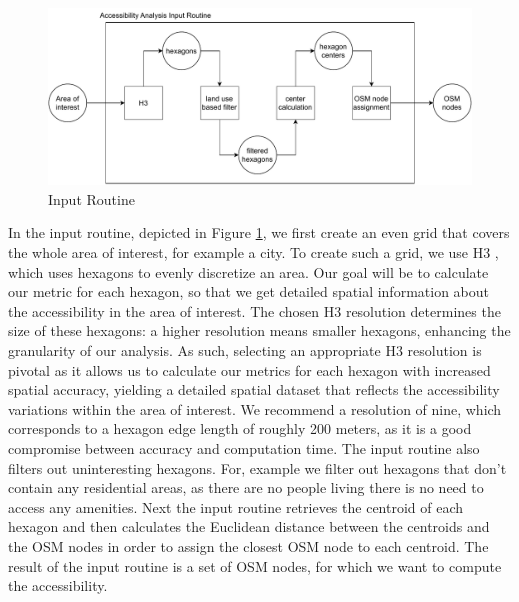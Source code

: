 \begin{figure}
    \centering
    \includegraphics[scale=0.60]{Figures/method/input_routine}
    \caption{Input Routine}
    \label{fig:input_routine}
\end{figure}
In the input routine, depicted in Figure \ref{fig:input_routine}, we first create an even grid that covers the whole area of interest, for example a city.
To create such a grid, we use H3 , which uses hexagons to evenly discretize an area.
Our goal will be to calculate our metric for each hexagon, so that we get detailed spatial information about the accessibility in the area of interest.
The chosen H3 resolution determines the size of these hexagons: a higher resolution means smaller hexagons, enhancing the granularity of our analysis. 
As such, selecting an appropriate H3 resolution is pivotal as it allows us to calculate our metrics for each hexagon with increased spatial accuracy, yielding a detailed spatial dataset that reflects the accessibility variations within the area of interest.
We recommend a resolution of nine, which corresponds to a hexagon edge length of roughly 200 meters, as it is a good compromise between accuracy and computation time.
The input routine also filters out uninteresting hexagons.
For, example we filter out hexagons that don't contain any residential areas, as there are no people living there is no need to access any amenities.
Next the input routine retrieves the centroid of each hexagon and then calculates the Euclidean distance between the centroids and the OSM nodes in order to assign the closest OSM node to each centroid.
The result of the input routine is a set of OSM nodes, for which we want to compute the accessibility.


